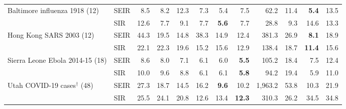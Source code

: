 \begin{tabular}{llrrrrrrrrrr}
Baltimore influenza 1918 (12) & SEIR & 8.5 & 8.2 & 12.3 & 7.3 & 5.4 & 7.5 & 62.2 & 11.4 & \textbf{5.4} & 13.5 \\
 & SIR & 12.6 & 7.7 & 9.1 & 7.7 & \textbf{5.6} & 7.7 & 28.8 & 9.3 & 14.6 & 13.3 \\
Hong Kong SARS 2003 (12) & SEIR & 44.3 & 19.5 & 14.8 & 38.3 & 14.9 & 12.4 & 381.3 & 26.9 & \textbf{8.1} & 18.9 \\
 & SIR & 22.1 & 22.3 & 19.6 & 15.2 & 15.6 & 12.9 & 138.4 & 18.7 & \textbf{11.4} & 15.6 \\
Sierra Leone Ebola 2014-15 (18) & SEIR & 8.6 & 8.0 & 7.1 & 6.1 & 6.0 & \textbf{5.5} & 105.2 & 18.4 & 7.5 & 12.4 \\
 & SIR & 10.0 & 9.6 & 8.8 & 6.1 & 6.1 & \textbf{5.8} & 94.2 & 19.4 & 5.9 & 11.0 \\
Utah COVID-19 cases$^\dagger$ (48) & SEIR & 27.3 & 18.7 & 14.5 & 16.2 & \textbf{9.6} & 10.2 & 1,963.2 & 53.8 & 10.3 & 21.9 \\
 & SIR & 25.5 & 24.1 & 20.8 & 12.6 & 13.4 & \textbf{12.3} & 310.3 & 26.2 & 34.5 & 34.8 \\
\bottomrule
\end{tabular}
